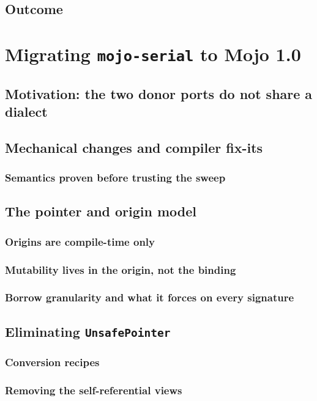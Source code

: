 \documentclass[11pt,a4paper]{report}
\begin{document}
\section{Outcome}

\chapter{Migrating \texttt{mojo-serial} to Mojo 1.0}
\section{Motivation: the two donor ports do not share a dialect}
\section{Mechanical changes and compiler fix-its}
\subsection{Semantics proven before trusting the sweep}
\section{The pointer and origin model}
\subsection{Origins are compile-time only}
\subsection{Mutability lives in the origin, not the binding}
\subsection{Borrow granularity and what it forces on every signature}
\section{Eliminating \texttt{UnsafePointer}}
\subsection{Conversion recipes}
\subsection{Removing the self-referential views}
\end{document}
